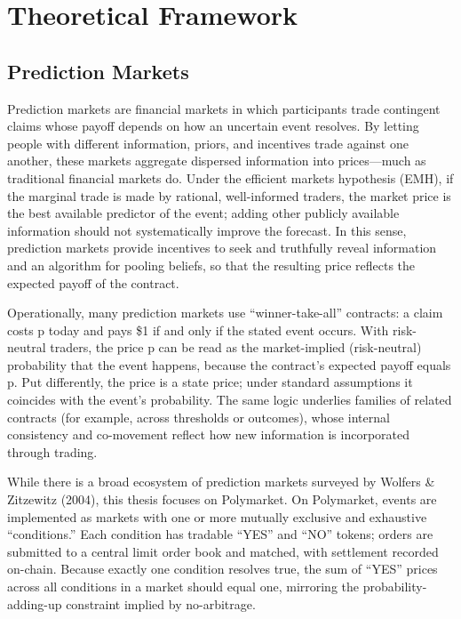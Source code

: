 \section{Theoretical Framework}

\subsection{Prediction Markets}


Prediction markets are financial markets in which participants trade contingent claims whose payoff depends on how an uncertain event resolves. By letting people with different information, priors, and incentives trade against one another, these markets aggregate dispersed information into prices—much as traditional financial markets do. Under the efficient markets hypothesis (EMH), if the marginal trade is made by rational, well-informed traders, the market price is the best available predictor of the event; adding other publicly available information should not systematically improve the forecast.  In this sense, prediction markets provide incentives to seek and truthfully reveal information and an algorithm for pooling beliefs, so that the resulting price reflects the expected payoff of the contract.

Operationally, many prediction markets use “winner-take-all” contracts: a claim costs p today and pays \$1 if and only if the stated event occurs. With risk-neutral traders, the price p can be read as the market-implied (risk-neutral) probability that the event happens, because the contract’s expected payoff equals p. Put differently, the price is a state price; under standard assumptions it coincides with the event’s probability.  The same logic underlies families of related contracts (for example, across thresholds or outcomes), whose internal consistency and co-movement reflect how new information is incorporated through trading.


While there is a broad ecosystem of prediction markets surveyed by Wolfers \& Zitzewitz (2004), this thesis focuses on Polymarket. 
On Polymarket, events are implemented as markets with one or more mutually exclusive and exhaustive “conditions.” Each condition has tradable “YES” and “NO” tokens; orders are submitted to a central limit order book and matched, with settlement recorded on-chain. Because exactly one condition resolves true, the sum of “YES” prices across all conditions in a market should equal one, mirroring the probability-adding-up constraint implied by no-arbitrage.



